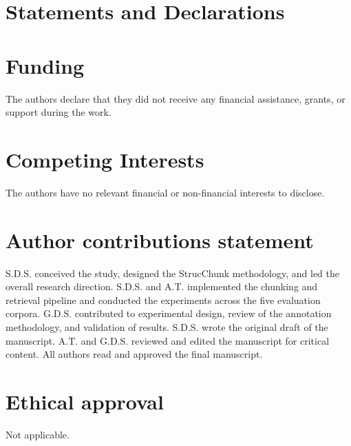 \documentclass[sn-mathphys,Numbered]{sn-jnl}%
\begin{document}


\section*{Statements and Declarations}

\section*{Funding}
The authors declare that they did not receive any financial assistance, grants, or support during the work.

\section*{Competing Interests}
The authors have no relevant financial or non-financial interests to disclose.

\section*{Author contributions statement}
S.D.S. conceived the study, designed the StrucChunk methodology, and led the overall research direction. S.D.S. and A.T. implemented the chunking and retrieval pipeline and conducted the experiments across the five evaluation corpora. G.D.S. contributed to experimental design, review of the annotation methodology, and validation of results. S.D.S. wrote the original draft of the manuscript. A.T. and G.D.S. reviewed and edited the manuscript for critical content. All authors read and approved the final manuscript.

\section*{Ethical approval}
Not applicable.
\end{document}
